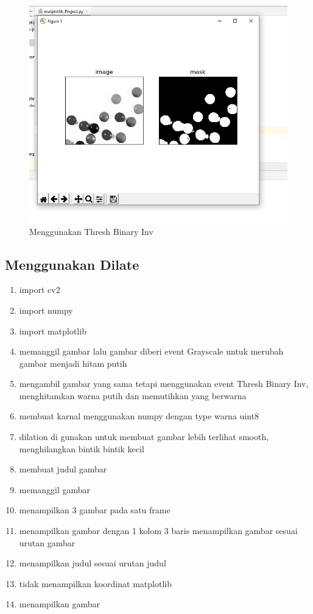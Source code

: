 \newpage
\begin{figure}[ht]
\centering
\includegraphics[scale=0.6]{figures/2,51.jpg}
\caption{Menggunakan Thresh Binary Inv}
\label{contoh}
\end{figure}








\newpage
\subsection{Menggunakan Dilate}

\begin{enumerate}
	\item import cv2
	\item import numpy
	\item import matplotlib
	\item memanggil gambar lalu gambar diberi event Grayscale untuk merubah gambar menjadi hitam putih
	\item mengambil gambar yang sama tetapi menggunakan event Thresh Binary Inv, menghitamkan warna putih dan memutihkan yang berwarna
	\item membuat karnal menggunakan numpy dengan type warna uint8
	\item dilation di gunakan untuk membuat gambar lebih terlihat smooth, menghilangkan bintik bintik kecil
	\item membuat judul gambar
	\item memanggil gambar
	\item menampilkan 3 gambar pada satu frame
	\item menampilkan gambar dengan 1 kolom 3 baris menampilkan gambar sesuai urutan gambar
	\item menampilkan judul sesuai urutan judul
	\item tidak menampilkan koordinat matplotlib
	\item menampilkan gambar
\end{enumerate}

